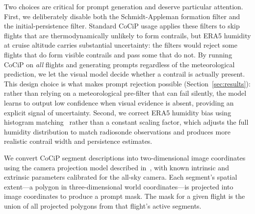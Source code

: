 \documentclass[1p,11pt]{elsarticle}
\begin{document}
Two choices are critical for prompt generation and deserve particular attention. First, we deliberately disable both the Schmidt-Appleman formation filter and the initial-persistence filter. Standard CoCiP usage applies these filters to skip flights that are thermodynamically unlikely to form contrails, but ERA5 humidity at cruise altitude carries substantial uncertainty: the filters would reject some flights that do form visible contrails and pass some that do not. By running CoCiP on \emph{all} flights and generating prompts regardless of the meteorological prediction, we let the visual model decide whether a contrail is actually present. This design choice is what makes prompt rejection possible (Section~\ref{sec:results}): rather than relying on a meteorological pre-filter that can fail silently, the model learns to output low confidence when visual evidence is absent, providing an explicit signal of uncertainty. Second, we correct ERA5 humidity bias using histogram matching~\cite{pycontrails} rather than a constant scaling factor, which adjusts the full humidity distribution to match radiosonde observations and produces more realistic contrail width and persistence estimates.

We convert CoCiP segment descriptions into two-dimensional image coordinates using the camera projection model described in~\cite{jarry2025gvccs}, with known intrinsic and extrinsic parameters calibrated for the all-sky camera. Each segment's spatial extent---a polygon in three-dimensional world coordinates---is projected into image coordinates to produce a prompt mask. The mask for a given flight is the union of all projected polygons from that flight's active segments.
\end{document}
